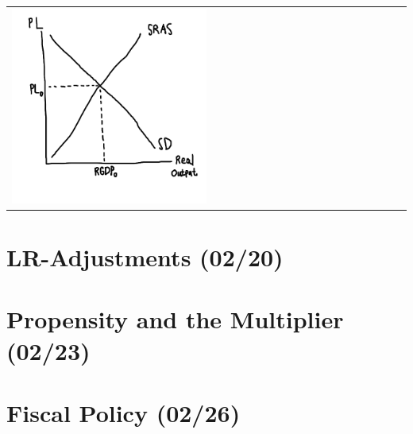 \documentclass[
  letterpaper,
  DIV=11,
  numbers=noendperiod]{scrartcl}
\begin{document}
\begin{longtable}[]{@{}
  >{\raggedright\arraybackslash}p{}@{}}
\textbar{}
\includegraphics[width=0.5\textwidth,height=\textheight]{img/agg-model.png} \\
\end{longtable}

\newpage{}

\section{LR-Adjustments (02/20)}\label{lr-adjustments-0220}

\section{Propensity and the Multiplier
(02/23)}\label{propensity-and-the-multiplier-0223}

\section{Fiscal Policy (02/26)}\label{fiscal-policy-0226}
\end{document}

